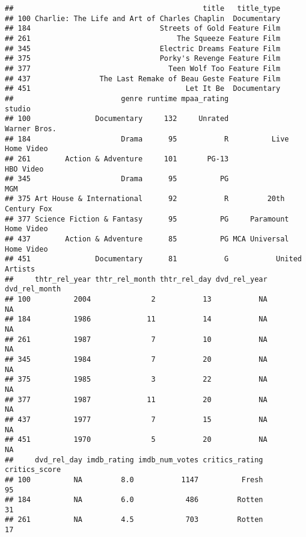 \documentclass[]{article}
\newenvironment{Shaded}{\begin{snugshade}}{\end{snugshade}}
\newcommand{\CommentTok}[1]{\textcolor[rgb]{0.56,0.35,0.01}{\textit{#1}}}
\newcommand{\KeywordTok}[1]{\textcolor[rgb]{0.13,0.29,0.53}{\textbf{#1}}}
\newcommand{\NormalTok}[1]{#1}
\newcommand{\OperatorTok}[1]{\textcolor[rgb]{0.81,0.36,0.00}{\textbf{#1}}}
\newcommand{\StringTok}[1]{\textcolor[rgb]{0.31,0.60,0.02}{#1}}
\begin{document}
\begin{Shaded}
\begin{Highlighting}[]
{{\CommentTok{#DVD realease date}
\NormalTok{movies[}\OperatorTok{!}\KeywordTok{complete.cases}\NormalTok{(movies[}\StringTok{'dvd_rel_year'}\NormalTok{]), ]}
\end{Highlighting}
\end{Shaded}

\begin{verbatim}
##                                            title   title_type
## 100 Charlie: The Life and Art of Charles Chaplin  Documentary
## 184                              Streets of Gold Feature Film
## 261                                  The Squeeze Feature Film
## 345                              Electric Dreams Feature Film
## 375                              Porky's Revenge Feature Film
## 377                                Teen Wolf Too Feature Film
## 437                The Last Remake of Beau Geste Feature Film
## 451                                    Let It Be  Documentary
##                         genre runtime mpaa_rating                   studio
## 100               Documentary     132     Unrated             Warner Bros.
## 184                     Drama      95           R          Live Home Video
## 261        Action & Adventure     101       PG-13                HBO Video
## 345                     Drama      95          PG                      MGM
## 375 Art House & International      92           R         20th Century Fox
## 377 Science Fiction & Fantasy      95          PG     Paramount Home Video
## 437        Action & Adventure      85          PG MCA Universal Home Video
## 451               Documentary      81           G           United Artists
##     thtr_rel_year thtr_rel_month thtr_rel_day dvd_rel_year dvd_rel_month
## 100          2004              2           13           NA            NA
## 184          1986             11           14           NA            NA
## 261          1987              7           10           NA            NA
## 345          1984              7           20           NA            NA
## 375          1985              3           22           NA            NA
## 377          1987             11           20           NA            NA
## 437          1977              7           15           NA            NA
## 451          1970              5           20           NA            NA
##     dvd_rel_day imdb_rating imdb_num_votes critics_rating critics_score
## 100          NA         8.0           1147          Fresh            95
## 184          NA         6.0            486         Rotten            31
## 261          NA         4.5            703         Rotten            17

\end{verbatim}
\end{document}
